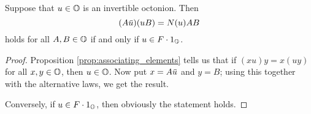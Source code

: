 \begin{corollary}
	\label{cor:1_auub}
	Suppose that $u\in \mathbb{O}$ is an invertible octonion. Then
	\begin{equation}
		(A\mathord{\mbox{\hspace*{0pt}}\,\overline{\!u\!\!\;}\!\:}\mbox{\hspace*{0pt}})(u B) = N(u) AB
	\end{equation}
	holds for all $A,B \in \mathbb{O}$ if and only if $u \in F \cdot 1_{\mathbb{O}}$. 
\end{corollary}

\begin{proof}
	Proposition \ref{prop:associating_elements} tells us that if $(xu) y = x(uy)$ for all
	$x,y \in \mathbb{O}$, then $u \in \mathbb{O}$. Now put $x = A\mathord{\mbox{\hspace*{0pt}}\,\overline{\!u\!\!\;}\!\:}\mbox{\hspace*{0pt}}$ and $y = B$; using this together with
	the alternative laws, we get the result. 
	
	Conversely, if $u \in F\cdot 1_{\mathbb{O}}$, then obviously the statement holds. 
\end{proof}



